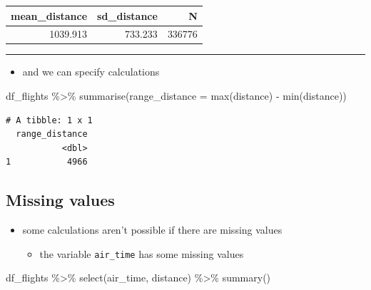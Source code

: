 \documentclass[
  letterpaper,
  DIV=11]{scrartcl}
\newenvironment{Shaded}{\begin{snugshade}}{\end{snugshade}}
\newcommand{\AttributeTok}[1]{\textcolor[rgb]{0.40,0.45,0.13}{#1}}
\newcommand{\FunctionTok}[1]{\textcolor[rgb]{0.28,0.35,0.67}{#1}}
\newcommand{\NormalTok}[1]{\textcolor[rgb]{0.00,0.23,0.31}{#1}}
\newcommand{\SpecialCharTok}[1]{\textcolor[rgb]{0.37,0.37,0.37}{#1}}
\providecommand{\tightlist}{%
  \setlength{\itemsep}{0pt}\setlength{\parskip}{0pt}}\usepackage{longtable,booktabs,array}
\begin{document}
\begin{table}
\centering
\begin{tabular}{r|r|r}
\hline
mean\_distance & sd\_distance & N\\
\hline
1039.913 & 733.233 & 336776\\
\hline
\end{tabular}
\end{table}

\begin{center}\rule{0.5\linewidth}{0.5pt}\end{center}

\begin{itemize}
\tightlist
\item
  and we can specify calculations
\end{itemize}

\begin{Shaded}
\begin{Highlighting}[]
\NormalTok{df\_flights }\SpecialCharTok{\%\textgreater{}\%} 
  \FunctionTok{summarise}\NormalTok{(}\AttributeTok{range\_distance =} \FunctionTok{max}\NormalTok{(distance) }\SpecialCharTok{{-}} \FunctionTok{min}\NormalTok{(distance))}
\end{Highlighting}
\end{Shaded}

\begin{verbatim}
# A tibble: 1 x 1
  range_distance
           <dbl>
1           4966
\end{verbatim}

\hypertarget{missing-values}{%
\subsection{Missing values}\label{missing-values}}

\begin{itemize}
\tightlist
\item
  some calculations aren't possible if there are missing values

  \begin{itemize}
  \tightlist
  \item
    the variable \texttt{air\_time} has some missing values
  \end{itemize}
\end{itemize}

\begin{Shaded}
\begin{Highlighting}[]
\NormalTok{df\_flights }\SpecialCharTok{\%\textgreater{}\%} 
  \FunctionTok{select}\NormalTok{(air\_time, distance) }\SpecialCharTok{\%\textgreater{}\%} 
  \FunctionTok{summary}\NormalTok{()}
\end{Highlighting}
\end{Shaded}
\end{document}
